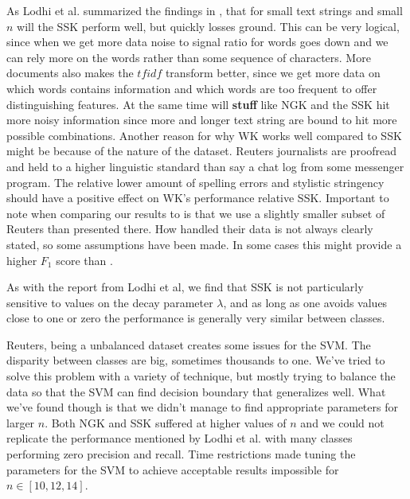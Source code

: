 


As Lodhi et al. summarized the findings in \cite{lodhi}, that for small text strings and small $ n $ will the SSK perform well, but quickly losses ground. This can be very logical, since when we get more data noise to signal ratio for words goes down and we can rely more on the words rather than some sequence of characters. More documents also makes the $ tfidf $ transform better, since we get more data on which words contains information and which words are too frequent to offer distinguishing features. At the same time will \textbf{stuff} like NGK and the SSK hit more noisy information since more and longer text string are bound to hit more possible combinations. Another reason for why WK works well compared to SSK might be because of the nature of the dataset. Reuters journalists are proofread and held to a higher linguistic standard than say a chat log from some messenger program. The relative lower amount of spelling errors and stylistic stringency should have a positive effect on WK's performance relative SSK. Important to note when comparing our results to \cite{lodhi} is that we use a slightly smaller subset of Reuters than presented there. How \cite{lodhi} handled their data is not always clearly stated, so some assumptions have been made. In some cases this might provide a higher $ F_1 $ score than \cite{lodh}.

As with the report from Lodhi et al, we find that SSK is not particularly sensitive to values on the decay parameter $ \lambda $, and as long as one avoids values close to one or zero the performance is generally very similar between classes.

Reuters, being a unbalanced dataset creates some issues for the SVM. The disparity between classes are big, sometimes thousands to one. We've tried to solve this problem with a variety of technique, but mostly trying to balance the data so that the SVM can find decision boundary that generalizes well. What we've found though is that we didn't manage to find appropriate parameters for larger $ n $. Both NGK and SSK suffered at higher values of $ n $ and we could not replicate the performance mentioned by Lodhi et al. with many classes performing zero precision and recall. Time restrictions made tuning the parameters for the SVM to achieve acceptable results impossible for $ n \in [10,12,14] $. 


